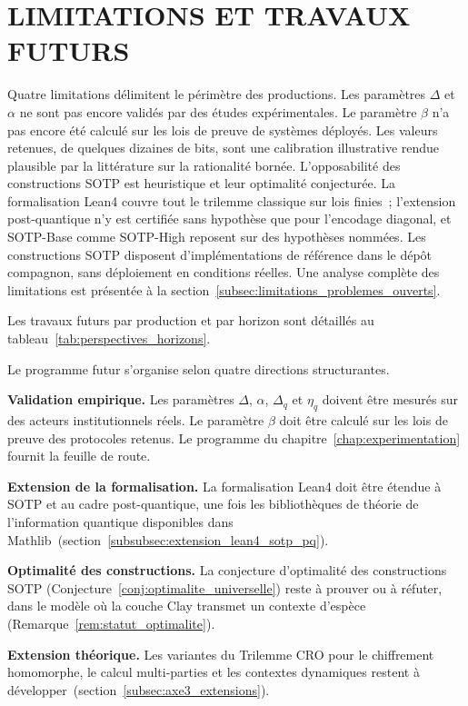 \section{LIMITATIONS ET TRAVAUX FUTURS}
\label{sec:cg_limitations}
\begin{sloppypar}

Quatre limitations d\'elimitent le p\'erim\`etre des productions. Les
param\`etres $\Delta$ et $\alpha$ ne sont pas encore valid\'es par des \'etudes exp\'erimentales.
Le param\`etre $\beta$ n'a pas encore \'et\'e calcul\'e sur les lois de preuve de syst\`emes d\'eploy\'es. Les valeurs retenues,
de quelques dizaines de bits, sont une calibration illustrative rendue
plausible par la litt\'erature sur la rationalit\'e born\'ee. L'opposabilit\'e
des constructions SOTP est heuristique et leur optimalit\'e conjectur\'ee. La formalisation Lean4 couvre tout le trilemme classique sur lois finies~; l'extension
post-quantique n'y est certifi\'ee sans hypoth\`ese que pour l'encodage diagonal, et SOTP-Base comme SOTP-High
reposent sur des hypoth\`eses nomm\'ees. Les constructions SOTP disposent d'impl\'ementations
de r\'ef\'erence dans le d\'ep\^ot compagnon, sans d\'eploiement en conditions
r\'eelles. Une
analyse compl\`ete des limitations est pr\'esent\'ee \`a la
section~\ref{subsec:limitations_problemes_ouverts}.

Les travaux futurs par production et par horizon sont d\'etaill\'es au
tableau~\ref{tab:perspectives_horizons}.

Le programme futur s'organise selon quatre directions structurantes.

\textbf{Validation empirique.} Les param\`etres $\Delta$, $\alpha$, $\Delta_q$ et $\eta_q$ doivent
\^etre mesur\'es sur des acteurs institutionnels r\'eels. Le param\`etre $\beta$ doit \^etre calcul\'e
sur les lois de preuve des protocoles retenus. Le programme du
chapitre~\ref{chap:experimentation} fournit la feuille de route.

\textbf{Extension de la formalisation.} La formalisation Lean4 doit
\^etre \'etendue \`a SOTP et au cadre post-quantique, une fois les
biblioth\`eques de th\'eorie de l'information quantique disponibles dans
Mathlib~(section~\ref{subsubsec:extension_lean4_sotp_pq}).

\textbf{Optimalit\'e des constructions.} La conjecture d'optimalit\'e des constructions SOTP
(Conjecture~\ref{conj:optimalite_universelle}) reste \`a prouver ou \`a r\'efuter, dans le mod\`ele
o\`u la couche Clay transmet un contexte d'esp\`ece
(Remarque~\ref{rem:statut_optimalite}).

\textbf{Extension th\'eorique.} Les variantes du Trilemme CRO pour le
chiffrement homomorphe, le calcul multi-parties et les contextes
dynamiques restent \`a d\'evelopper~(section~\ref{subsec:axe3_extensions}).

\end{sloppypar}


